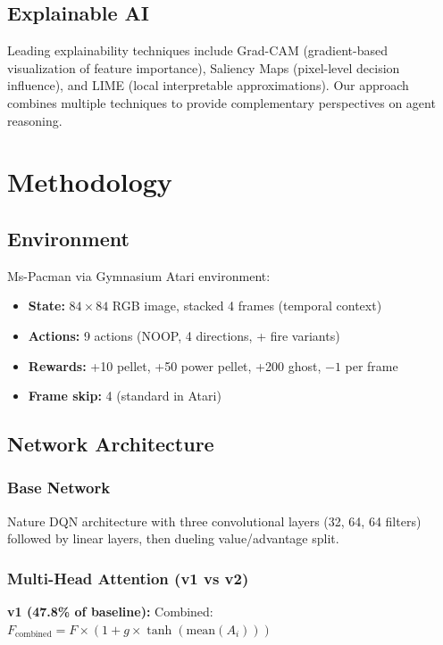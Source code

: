 \documentclass[11pt,a4paper]{article}
\begin{document}
\subsection{Explainable AI}

Leading explainability techniques include Grad-CAM (gradient-based visualization of feature importance), Saliency Maps (pixel-level decision influence), and LIME (local interpretable approximations). Our approach combines multiple techniques to provide complementary perspectives on agent reasoning.

\section{Methodology}

\subsection{Environment}

Ms-Pacman via Gymnasium Atari environment:
\begin{itemize}
    \item \textbf{State:} $84\times84$ RGB image, stacked 4 frames (temporal context)
    \item \textbf{Actions:} 9 actions (NOOP, 4 directions, + fire variants)
    \item \textbf{Rewards:} +10 pellet, +50 power pellet, +200 ghost, $-1$ per frame
    \item \textbf{Frame skip:} 4 (standard in Atari)
\end{itemize}

\subsection{Network Architecture}

\subsubsection{Base Network}

Nature DQN architecture with three convolutional layers (32, 64, 64 filters) followed by linear layers, then dueling value/advantage split.

\subsubsection{Multi-Head Attention (v1 vs v2)}

\textbf{v1 (47.8\% of baseline):}
Combined: $F_{\text{combined}} = F \times (1 + g \times \tanh(\text{mean}(A_i)))$
\end{document}
